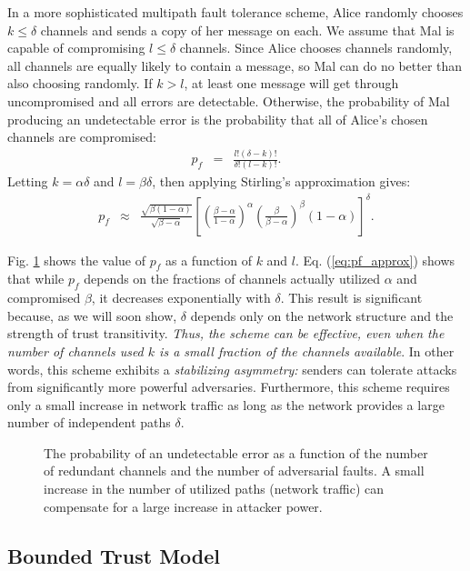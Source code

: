 \documentclass[10pt,letterpaper]{article}
\newcommand{\beq}{\begin{eqnarray}}
\newcommand{\eeq}{\end{eqnarray}}
\begin{document}
In a more sophisticated multipath fault tolerance scheme,
Alice randomly chooses $k \leq \delta$ channels and sends a copy of
her message on each.
We assume that Mal is capable of compromising $l \leq \delta$ channels.
Since Alice chooses channels randomly,
all channels are equally likely to contain a message,
so Mal can do no better than also choosing randomly.
If $k > l$, at least one message will get through uncompromised and all
errors are detectable.
Otherwise, the probability of Mal producing an undetectable error is
the probability that all of Alice's chosen channels are compromised:
\beq
\label{eq:pf}
p_f &=& \frac{l!(\delta-k)!}{\delta!(l-k)!}.
\eeq
Letting $k=\alpha \delta$ and $l=\beta \delta$, then applying Stirling's
approximation gives:
\begin{eqnarray}
\label{eq:pf_approx}
p_f &\approx&
\frac{\sqrt{\beta(1-\alpha)}}{\sqrt{\beta-\alpha}}
\left[
    \left( \frac{\beta-\alpha}{1-\alpha} \right)^{\alpha}
    \left( \frac{\beta}{\beta-\alpha} \right)^{\beta}
    (1-\alpha)
\right]^{\delta}.
\end{eqnarray}

Fig. \ref{fig:pfail} shows the value of $p_f$
as a function of $k$ and $l$.
Eq. (\ref{eq:pf_approx}) shows that while $p_f$
depends on the fractions of
channels actually utilized $\alpha$ and compromised $\beta$,
it decreases exponentially with $\delta$.
This result is significant because,
as we will soon show, $\delta$
depends only on the network structure
and the strength of trust transitivity.
{\em Thus, the scheme can be effective, even when the number of channels used
$k$ is a small fraction of the channels available}.
In other words, this scheme exhibits a {\em stabilizing asymmetry:}
senders can tolerate attacks from significantly more powerful
adversaries.
Furthermore, this scheme requires only a small increase in network traffic
as long as the network provides a large number of independent paths $\delta$.

\begin{figure}[!h]
\caption{
The probability of an undetectable error as a function of the number of
redundant channels and the number of adversarial faults.
A small increase in the number of utilized paths (network traffic)
can compensate for a large increase in attacker power.
}
\label{fig:pfail}
\end{figure}

\subsection*{Bounded Trust Model}
\end{document}
